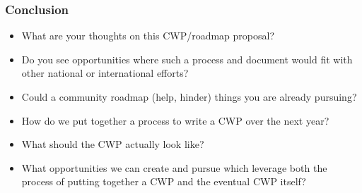 \begin{frame}
\frametitle{Conclusion}

\begin{itemize}
\item What are your thoughts on this CWP/roadmap proposal?
\item Do you see opportunities where such a process and document would fit with other national or international efforts?
\item Could a community roadmap (help, hinder) things you are already pursuing?
\item How do we put together a process to write a CWP over the next year?
\item What should the CWP actually look like?
\item What opportunities we can create and pursue which leverage both the process of putting together a CWP and the eventual CWP itself?
\end{itemize}



\end{frame}


